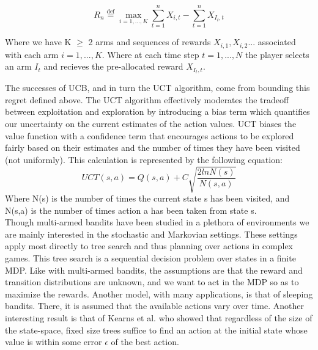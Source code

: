 \documentclass[msc, deptreport, ai, romanprepages]{infthesis}
\newcommand*{\defeq}{\stackrel{\text{def}}{=}}
\begin{document}
\begin{equation}
R_n \defeq \max_{i=1,...,K} \sum_{t=1}^n X_{i,t} - \sum_{t=1}^n X_{I_t,t}
\end{equation}

Where we have K \(\geq\) 2 arms and sequences of rewards \(X_{i,1},X_{i,2}...\) associated with each arm \( i = 1,...,K\). Where at each time step \( t=1,...,N\) the player selects an arm \(I_t\) and recieves the pre-allocated reward \(X_{I_t,t}\).

The successes of UCB, and in turn the UCT algorithm, come from bounding this regret defined above. The UCT algorithm effectively moderates the tradeoff between exploitation and exploration by introducing a bias term which quantifies our uncertainty on the current estimates of the action values. UCT biases the value function with a confidence term that encourages actions to be explored fairly based on their estimates and the number of times they have been visited (not uniformly). This calculation is represented by the following equation:
\begin{equation}
UCT(s,a) = Q(s,a) + C \sqrt{\frac{2lnN(s)}{N(s,a)}}
\end{equation}
Where N(s) is the number of times the current state s has been visited, and N(s,a) is the number of times action a has been taken from state s. \\
Though multi-armed bandits have been studied in a plethora of environments we are mainly interested in the stochastic and Markovian settings. These settings apply most directly to tree search and thus planning over actions in complex games. This tree search is a sequential decision problem over states in a finite MDP. Like with multi-armed bandits, the assumptions are that the reward and transition distributions are unknown, and we want to act in the MDP so as to maximize the rewards. Another model, with many applications, is that of sleeping bandits. There, it is assumed that the available actions vary over time. \cite{regretAnalysis} Another interesting result is that of Kearns et al. who showed that regardless of the size of the state-space, fixed size trees suffice to find an action at the initial state whose value is within some error \(\epsilon\) of the best action. \cite{Kearns2002}
\end{document}
